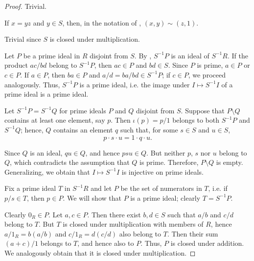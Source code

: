 \begin{proof}
   Trivial.

   If \( x = yz \) and \( y \in S \), then, in the notation of , \( (x, y) \sim (z, 1) \).

   Trivial since \( S \) is closed under multiplication.

   Let \( P \) be a prime ideal in \( R \) disjoint from \( S \). By , \( S^{-1} P \) is an ideal of \( S^{-1} R \). If the product \( {ac} / {bd} \) belong to \( S^{-1} P \), then \( ac \in P \) and \( bd \in S \). Since \( P \) is prime, \( a \in P \) or \( c \in P \). If \( a \in P \), then \( ba \in P \) and \( a / d = {ba} / {bd} \in S^{-1} P \); if \( c \in P \), we proceed analogously. Thus, \( S^{-1} P \) is a prime ideal, i.e. the image under \( I \mapsto S^{-1} I \) of a prime ideal is a prime ideal.

   Let \( S^{-1} P = S^{-1} Q \) for prime ideals \( P \) and \( Q \) disjoint from \( S \). Suppose that \( P \setminus Q \) contains at least one element, say \( p \). Then \( \iota(p) = p / 1 \) belongs to both \( S^{-1} P \) and \( S^{-1} Q \); hence, \( Q \) contains an element \( q \) such that, for some \( s \in S \) and \( u \in S \),
  \begin{equation*}
    p \cdot s \cdot u = 1 \cdot q \cdot u.
  \end{equation*}

  Since \( Q \) is an ideal, \( qu \in Q \), and hence \( psu \in Q \). But neither \( p \), \( s \) nor \( u \) belong to \( Q \), which contradicts the assumption that \( Q \) is prime. Therefore, \( P \setminus Q \) is empty. Generalizing, we obtain that \( I \mapsto S^{-1} I \) is injective on prime ideals.

   Fix a prime ideal \( T \) in \( S^{-1} R \) and let \( P \) be the set of numerators in \( T \), i.e. if \( p / s \in T \), then \( p \in P \). We will show that \( P \) is a prime ideal; clearly \( T = S^{-1} P \).

  Clearly \( 0_R \in P \). Let \( a, c \in P \). Then there exist \( b, d \in S \) such that \( a / b \) and \( c / d \) belong to \( T \). But \( T \) is closed under multiplication with members of \( R \), hence \( a / 1_R = b (a / b) \) and \( c / 1_R = d (c / d) \) also belong to \( T \). Then their sum \( (a + c) / 1 \) belongs to \( T \), and hence also to \( P \). Thus, \( P \) is closed under addition. We analogously obtain that it is closed under multiplication.


\end{proof}
